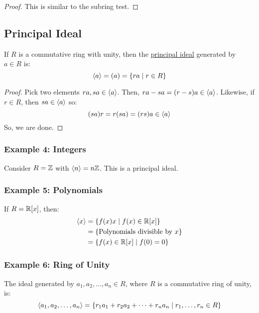 \documentclass[letterpaper]{article}
\begin{document}
\begin{mdframed}[]
    \begin{proof}
        This is similar to the subring test.
    \end{proof}
\end{mdframed}

\subsection{Principal Ideal}
If $R$ is a commutative ring with unity, then the \underline{principal ideal} generated by $a \in R$ is:
\[\langle a \rangle = (a) = \{ra \mid r \in R\}\]

\begin{mdframed}[]
    \begin{proof}
        Pick two elements $ra, sa \in \langle a \rangle$. Then, $ra - sa = (r - s)a \in \langle a \rangle$. Likewise, if $r \in R$, then $sa \in \langle a \rangle$ so:
        \[(sa)r = r(sa) = (rs)a \in \langle a \rangle\]
        So, we are done. 
    \end{proof}
\end{mdframed}

\subsubsection{Example 4: Integers}
Consider $R = \mathbb{Z}$ with $\langle n \rangle = n\mathbb{Z}$. This is a principal ideal. 

\subsubsection{Example 5: Polynomials}
If $R = \mathbb{R}[x]$, then:
\begin{equation*}
    \begin{aligned}
        \langle x \rangle &= \{f(x)x \mid f(x) \in \mathbb{R}[x]\} \\ 
            &= \{\text{Polynomials divisible by } x\} \\
            &= \{f(x) \in \mathbb{R}[x] \mid f(0) = 0\}
    \end{aligned}
\end{equation*}

\subsubsection{Example 6: Ring of Unity}
The ideal generated by $a_1, a_2, \dots, a_n \in R$, where $R$ is a commutative ring of unity, is:
\[\langle a_1, a_2, \dots, a_n \rangle = \{r_1 a_1 + r_2 a_2 + \dots + r_n a_n \mid r_1, \dots, r_n \in R\}\]
\end{document}
